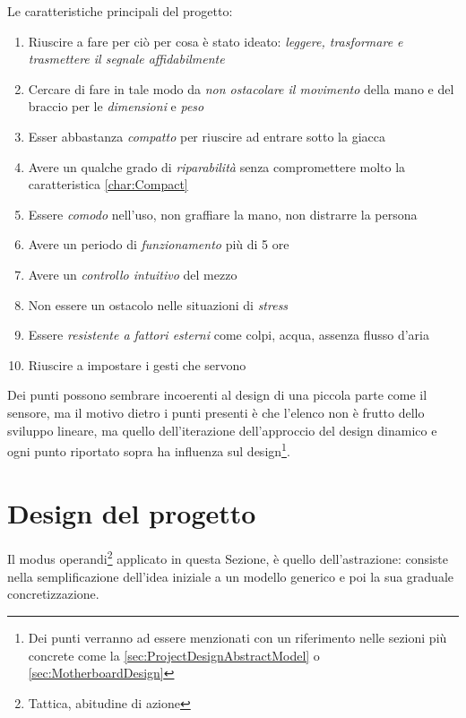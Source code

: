\documentclass[a4paper, 10pt, final]{article} %
\begin{document}
    \noindent Le caratteristiche principali del progetto:
    \begin{enumerate}[label=\emph{(\arabic*)}]
        \item Riuscire a fare per ci\`{o} per cosa \`{e} stato ideato: \emph{leggere, trasformare e trasmettere il segnale affidabilmente} \label{char:Reliability}
        \item Cercare di fare in tale modo da \emph{non ostacolare il movimento} della mano e del braccio per le \emph{dimensioni} e \emph{peso} \label{char:CompactNoDriveImpact}
        \item Esser abbastanza \emph{compatto} per riuscire ad entrare sotto la giacca \label{char:Compact}
        \item Avere un qualche grado di \emph{riparabilit\`{a}} senza compromettere molto la caratteristica \ref{char:Compact} \label{char:Repairability}
        \item Essere \emph{comodo} nell'uso, non graffiare la mano, non distrarre la persona \label{char:ComfortableNoPain}
        \item Avere un periodo di \emph{funzionamento} pi\`{u} di 5 ore \label{char:Automaticity}
        \item Avere un \emph{controllo intuitivo} del mezzo \label{char:IntuitiveControl}
        \item Non essere un ostacolo nelle situazioni di \emph{stress} \label{char:StressReactionAdapted}
        \item Essere \emph{resistente a fattori esterni} come colpi, acqua, assenza flusso d'aria \label{char:ExternalImpactAdapted}
        \item Riuscire a impostare i gesti che servono \label{char:GestureVariability}
    \end{enumerate}
    Dei punti possono sembrare incoerenti al design di una piccola parte come il sensore, ma il motivo dietro i punti presenti \`{e} che l'elenco non \`{e} frutto dello sviluppo lineare, ma quello dell'iterazione dell'approccio del design dinamico e ogni punto riportato sopra ha influenza sul design\footnote{Dei punti verranno ad essere menzionati con un riferimento nelle sezioni pi\`{u} concrete come la \ref{sec:ProjectDesignAbstractModel} o \ref{sec:MotherboardDesign}}. 

    \section{Design del progetto}\label{sec:ProjectDesign}
    Il modus operandi\footnote{Tattica, abitudine di azione} applicato in questa Sezione, \`{e} quello dell'astrazione: consiste nella semplificazione dell'idea iniziale a un modello generico e poi la sua graduale concretizzazione.
\end{document}
